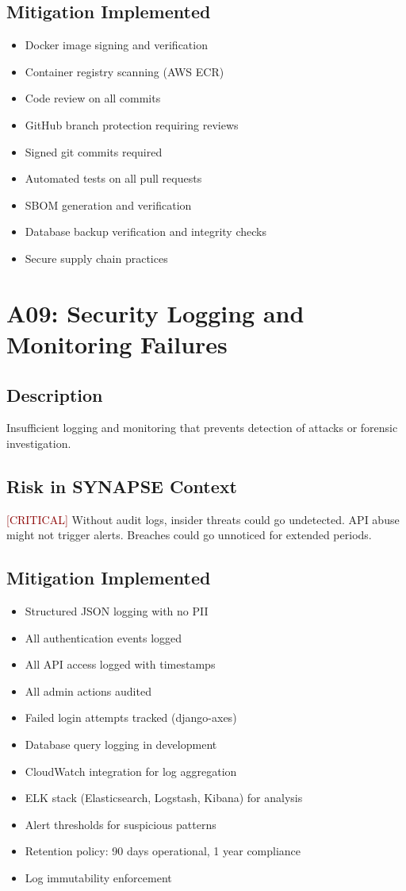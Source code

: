 \documentclass{report}
\begin{document}
\subsection{Mitigation Implemented}
\begin{itemize}
\item Docker image signing and verification
\item Container registry scanning (AWS ECR)
\item Code review on all commits
\item GitHub branch protection requiring reviews
\item Signed git commits required
\item Automated tests on all pull requests
\item SBOM generation and verification
\item Database backup verification and integrity checks
\item Secure supply chain practices
\end{itemize}

\section{A09: Security Logging and Monitoring Failures}

\subsection{Description}
Insufficient logging and monitoring that prevents detection of attacks or forensic investigation.

\subsection{Risk in SYNAPSE Context}
\textcolor{darkred}{[CRITICAL]} Without audit logs, insider threats could go undetected. API abuse might not trigger alerts. Breaches could go unnoticed for extended periods.

\subsection{Mitigation Implemented}
\begin{itemize}
\item Structured JSON logging with no PII
\item All authentication events logged
\item All API access logged with timestamps
\item All admin actions audited
\item Failed login attempts tracked (django-axes)
\item Database query logging in development
\item CloudWatch integration for log aggregation
\item ELK stack (Elasticsearch, Logstash, Kibana) for analysis
\item Alert thresholds for suspicious patterns
\item Retention policy: 90 days operational, 1 year compliance
\item Log immutability enforcement
\end{itemize}
\end{document}
